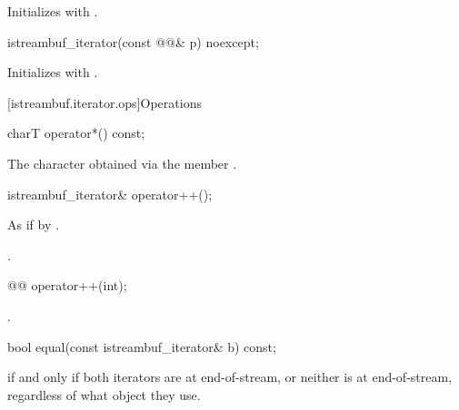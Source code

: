\begin{itemdescr}
\pnum
\effects
Initializes  with .
\end{itemdescr}


%
\begin{itemdecl}
istreambuf_iterator(const @@& p) noexcept;
\end{itemdecl}

\begin{itemdescr}
\pnum
\effects
Initializes  with .
\end{itemdescr}

[istreambuf.iterator.ops]{Operations}

%
\begin{itemdecl}
charT operator*() const;
\end{itemdecl}

\begin{itemdescr}
\pnum
\returns
The character obtained via the
member
.
\end{itemdescr}

%
\begin{itemdecl}
istreambuf_iterator& operator++();
\end{itemdecl}

\begin{itemdescr}
\pnum
\effects
As if by .

\pnum
\returns
{}.
\end{itemdescr}

%
\begin{itemdecl}
@@ operator++(int);
\end{itemdecl}

\begin{itemdescr}
\pnum
\returns
{}.
\end{itemdescr}

%
\begin{itemdecl}
bool equal(const istreambuf_iterator& b) const;
\end{itemdecl}

\begin{itemdescr}
\pnum
\returns
{}
if and only if both iterators are at end-of-stream,
or neither is at end-of-stream, regardless of what
object they use.
\end{itemdescr}


